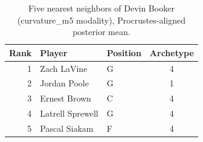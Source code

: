 \begin{table}[htbp]
  \centering\small
  \begin{tabular}{rllc}
    \toprule
    Rank & Player & Position & Archetype \\
    \midrule
    1 & Zach LaVine & G & 4 \\
    2 & Jordan Poole & G & 1 \\
    3 & Ernest Brown & C & 4 \\
    4 & Latrell Sprewell & G & 4 \\
    5 & Pascal Siakam & F & 4 \\
    \bottomrule
  \end{tabular}
  \caption{Five nearest neighbors of Devin Booker (curvature_m5 modality), Procrustes-aligned posterior mean.}
  \label{tab:Devin_Booker_neighbors_curvature_m5}
\end{table}

